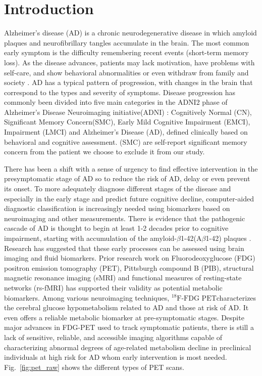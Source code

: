 \documentclass[authoryear,preprint,revi	ew,12pt]{elsarticle}
\newcommand{\FDGPET}   {$ ^{18}\textrm{F-FDG PET} $}
\begin{document}
\section{Introduction}
Alzheimer’s disease (AD) is a chronic neurodegenerative disease in which amyloid plaques and neurofibrillary tangles accumulate in the brain. The most common early symptom is the difficulty remembering recent events (short-term memory loss). As the disease advances, patients may lack motivation, have problems with self-care, and show behavioral abnormalities or even withdraw from family and society \citep{Burns2009}. AD has a typical pattern of progression, with changes in the brain that correspond to the types and severity of symptoms. Disease progression has commonly been divided into five main categories in the ADNI2 phase of Alzheimer's Disease Neuroimaging initiative(ADNI) \citep{weiner2013alzheimer}: Cognitively Normal (CN), Significant Memory Concern(SMC), Early Mild Cognitive Impairment (EMCI), Impairment (LMCI) and Alzheimer's Disease (AD), defined clinically based on behavioral and cognitive assessment. (SMC) are self-report significant memory concern from the patient we choose to exclude it from our study.

There has been a shift with a sense of urgency to find effective intervention in the presymptomatic stage of AD so to reduce the risk of AD, delay or even prevent its onset. To more adequately diagnose different stages of the disease and especially in the early stage and predict future cognitive decline, computer-aided diagnostic classification is increasingly needed using biomarkers based on neuroimaging and other measurements.
There is evidence that the pathogenic cascade of AD is thought to begin at least 1-2 decades prior to cognitive impairment, starting with accumulation of the amyloid-$\beta$1-42(A$\beta$1-42) plaques \citep{langbaum2013ushering}. Research has suggested that these early processes can be assessed using brain imaging and fluid biomarkers. Prior research work on Fluorodeoxyglucose (FDG) positron emission tomography (PET), Pittsburgh compound B (PIB), structural magnetic resonance imaging (sMRI) and functional measures of resting-state networks (rs-fMRI) has supported their validity as potential metabolic biomarkers. Among various neuroimaging techniques, \FDGPET characterizes the cerebral glucose hypometabolism related to AD and those at risk of AD. It even offers a reliable metabolic biomarker at pre-symptomatic stages. Despite major advances in FDG-PET used to track symptomatic patients, there is still a lack of sensitive, reliable, and accessible imaging algorithms capable of characterizing abnormal degrees of age-related metabolism decline in preclinical individuals at high risk for AD whom early intervention is most needed. Fig.~\ref{fig:pet_raw} shows the different types of PET scans.
\end{document}
